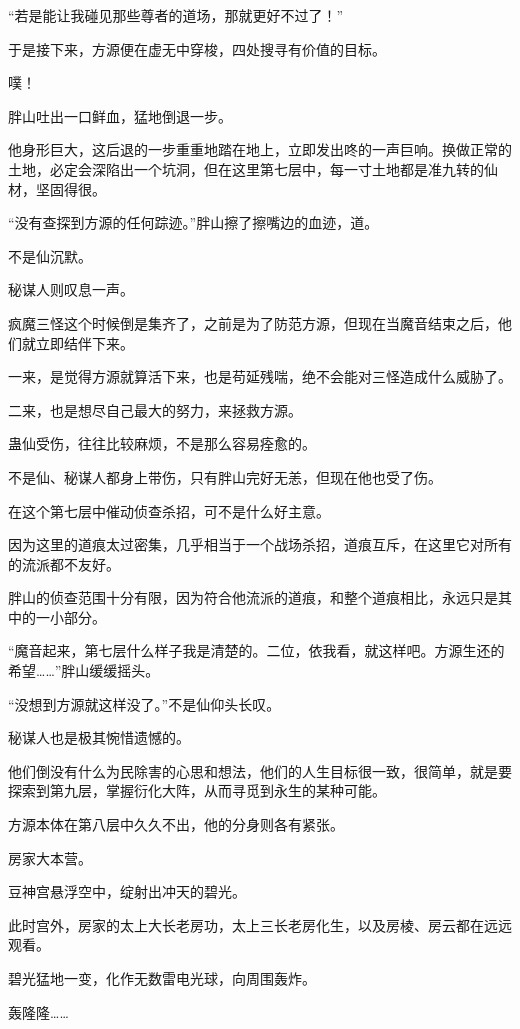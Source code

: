 \begin{this_body}
“若是能让我碰见那些尊者的道场，那就更好不过了！”

于是接下来，方源便在虚无中穿梭，四处搜寻有价值的目标。

噗！

胖山吐出一口鲜血，猛地倒退一步。

他身形巨大，这后退的一步重重地踏在地上，立即发出咚的一声巨响。换做正常的土地，必定会深陷出一个坑洞，但在这里第七层中，每一寸土地都是准九转的仙材，坚固得很。

“没有查探到方源的任何踪迹。”胖山擦了擦嘴边的血迹，道。

不是仙沉默。

秘谋人则叹息一声。

疯魔三怪这个时候倒是集齐了，之前是为了防范方源，但现在当魔音结束之后，他们就立即结伴下来。

一来，是觉得方源就算活下来，也是苟延残喘，绝不会能对三怪造成什么威胁了。

二来，也是想尽自己最大的努力，来拯救方源。

蛊仙受伤，往往比较麻烦，不是那么容易痊愈的。

不是仙、秘谋人都身上带伤，只有胖山完好无恙，但现在他也受了伤。

在这个第七层中催动侦查杀招，可不是什么好主意。

因为这里的道痕太过密集，几乎相当于一个战场杀招，道痕互斥，在这里它对所有的流派都不友好。

胖山的侦查范围十分有限，因为符合他流派的道痕，和整个道痕相比，永远只是其中的一小部分。

“魔音起来，第七层什么样子我是清楚的。二位，依我看，就这样吧。方源生还的希望……”胖山缓缓摇头。

“没想到方源就这样没了。”不是仙仰头长叹。

秘谋人也是极其惋惜遗憾的。

他们倒没有什么为民除害的心思和想法，他们的人生目标很一致，很简单，就是要探索到第九层，掌握衍化大阵，从而寻觅到永生的某种可能。

方源本体在第八层中久久不出，他的分身则各有紧张。

房家大本营。

豆神宫悬浮空中，绽射出冲天的碧光。

此时宫外，房家的太上大长老房功，太上三长老房化生，以及房棱、房云都在远远观看。

碧光猛地一变，化作无数雷电光球，向周围轰炸。

轰隆隆……


\end{this_body}
